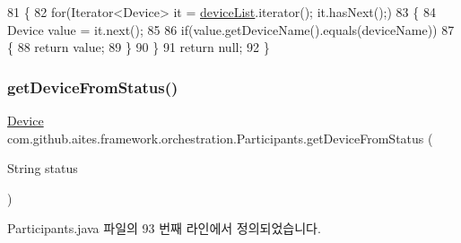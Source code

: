 \begin{DoxyCode}
81                                                       \{
82         \textcolor{keywordflow}{for}(Iterator<Device> it = \mbox{\hyperlink{classcom_1_1github_1_1aites_1_1framework_1_1orchestration_1_1_participants_ab90ca1b5cf16aec6e3e6608df4a8d2ad}{deviceList}}.iterator(); it.hasNext();)
83         \{
84             Device value = it.next();
85             
86             \textcolor{keywordflow}{if}(value.getDeviceName().equals(deviceName))
87             \{
88                 \textcolor{keywordflow}{return} value;
89             \}
90         \}
91         \textcolor{keywordflow}{return} null;
92     \}
\end{DoxyCode}
\mbox{\label{classcom_1_1github_1_1aites_1_1framework_1_1orchestration_1_1_participants_a705edd6ae52990deec865f2178a0735e}} 
\subsubsection{\texorpdfstring{get\+Device\+From\+Status()}{getDeviceFromStatus()}}
{\footnotesize\ttfamily \mbox{\hyperlink{classcom_1_1github_1_1aites_1_1framework_1_1orchestration_1_1_device}{Device}} com.\+github.\+aites.\+framework.\+orchestration.\+Participants.\+get\+Device\+From\+Status (\begin{DoxyParamCaption}\item[{String}]{status }\end{DoxyParamCaption})}



Participants.\+java 파일의 93 번째 라인에서 정의되었습니다.


